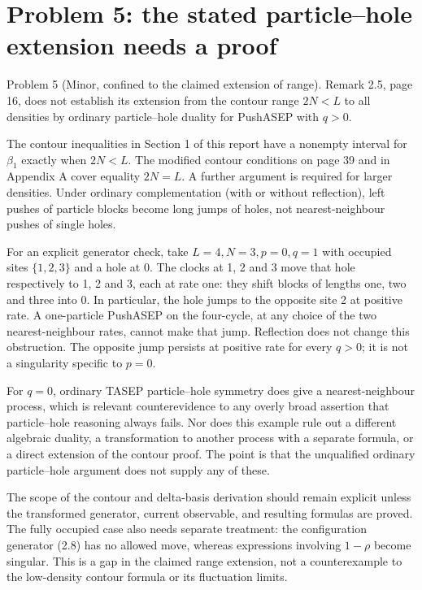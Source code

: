 \documentclass[10pt]{article}
\begin{document}
\section*{Problem 5: the stated particle–hole extension needs a proof}
Problem 5 (Minor, confined to the claimed extension of range).  Remark 2.5, page 16, does not establish its extension from the contour range \(2N<L\) to all densities by ordinary particle–hole duality for PushASEP with \(q>0\).\par
The contour inequalities in Section 1 of this report have a nonempty interval for \(\beta_1\) exactly when \(2N<L\). The modified contour conditions on page 39 and in Appendix A cover equality \(2N=L\). A further argument is required for larger densities. Under ordinary complementation (with or without reflection), left pushes of particle blocks become long jumps of holes, not nearest-neighbour pushes of single holes.\par
For an explicit generator check, take \(L=4,N=3,p=0,q=1\) with occupied sites \(\{1,2,3\}\) and a hole at 0. The clocks at 1, 2 and 3 move that hole respectively to 1, 2 and 3, each at rate one: they shift blocks of lengths one, two and three into 0. In particular, the hole jumps to the opposite site 2 at positive rate. A one-particle PushASEP on the four-cycle, at any choice of the two nearest-neighbour rates, cannot make that jump. Reflection does not change this obstruction. The opposite jump persists at positive rate for every \(q>0\); it is not a singularity specific to \(p=0\).\par
For \(q=0\), ordinary TASEP particle–hole symmetry does give a nearest-neighbour process, which is relevant counterevidence to any overly broad assertion that particle–hole reasoning always fails. Nor does this example rule out a different algebraic duality, a transformation to another process with a separate formula, or a direct extension of the contour proof. The point is that the unqualified ordinary particle–hole argument does not supply any of these.\par
The scope of the contour and delta-basis derivation should remain explicit unless the transformed generator, current observable, and resulting formulas are proved. The fully occupied case also needs separate treatment: the configuration generator (2.8) has no allowed move, whereas expressions involving \(1-\rho\) become singular. This is a gap in the claimed range extension, not a counterexample to the low-density contour formula or its fluctuation limits.\par
\end{document}
